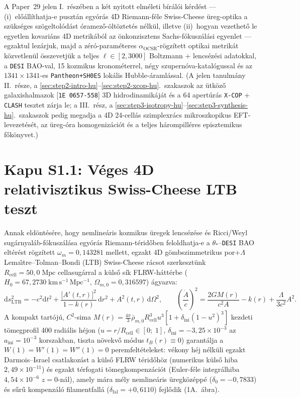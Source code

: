 \documentclass[11pt,a4paper]{article}
\begin{document}
A Paper~29 jelen I.~részében a két nyitott elméleti bírálói kérdést --- (i)~előállíthatja-e pusztán egyórás 4D Riemann-féle Swiss-Cheese üreg-optika a szükséges szögeltolódást óramező-öltöztetés nélkül, illetve (ii)~hogyan vezethető le egyetlen kovariáns 4D metrikából az önkonzisztens Sachs-fókuszálási egyenlet --- egzaktul lezárjuk, majd a zéró-paraméteres $\alpha_{\mathrm{OCSR}}$-rögzített optikai metrikát közvetlenül összevetjük a teljes $\ell \in [2, 3000]$ Boltzmann + lencsézési adatokkal, a \texttt{DESI} BAO-val, 15 kozmikus kronométerrel, négy szupernóva-katalógussal és az $1341\times 1341$-es \texttt{Pantheon+SH0ES} lokális Hubble-áramlással. (A jelen tanulmány II.~része, a \ref{sec:step2-intro-hu}--\ref{sec:step2-xcop-hu}.~szakaszok az ütköző galaxishalmazok [\texttt{1E~0657-558}] 3D hidrodinamikáját és a 64 apertúrás \texttt{X-COP} + \texttt{CLASH} tesztet zárja le; a III.~rész, a \ref{sec:step3-isotropy-hu}--\ref{sec:step3-synthesis-hu}.~szakaszok pedig megadja a 4D 24-cellás szimplexrács mikroszkopikus EFT-levezetését, az üreg-óra homogenizációt és a teljes hárompilléres episztemikus főkönyvet.)

\section{Kapu S1.1: Véges 4D relativisztikus Swiss-Cheese LTB teszt}
Annak eldöntésére, hogy nemlineáris kozmikus üregek lencsézése és Ricci/Weyl sugárnyaláb-fókuszálása egyórás Riemann-téridőben feloldhatja-e a $\theta_*$--\texttt{DESI} BAO eltérést rögzített $\omega_m = 0{,}143281$ mellett, egzakt 4D gömbszimmetrikus por+$\Lambda$ Lema\^{\i}tre--Tolman--Bondi (LTB) Swiss-Cheese rácsot szerkesztünk $R_{\mathrm{cell}} = 50{,}0\;\mathrm{Mpc}$ cellasugárral a külső sík FLRW-háttérbe ($H_0 = 67{,}2730\;\mathrm{km\,s^{-1}\,Mpc^{-1}}$, $\Omega_{m,0} = 0{,}316597$) ágyazva:
\begin{equation}
    \mathrm{d}s_{\mathrm{LTB}}^2 = -c^2\mathrm{d}t^2 + \frac{\bigl[A'(t,r)\bigr]^2}{1 - k(r)}\,\mathrm{d}r^2 + A^2(t,r)\,\mathrm{d}\Omega^2, \qquad \left(\frac{\dot{A}}{c}\right)^2 = \frac{2GM(r)}{c^2 A} - k(r) + \frac{\Lambda}{3c^2}A^2.
    \label{eq:ltb-metric-hu}
\end{equation}
A kompakt tartójú, $C^2$-sima $M(r) = \frac{4\pi}{3}\bar{\rho}_{m,0} R_{\mathrm{cell}}^3 u^3 [1 + \delta_{\mathrm{ini}}(1 - u^2)^3]$ kezdeti tömegprofil 400 radiális héjon ($u = r/R_{\mathrm{cell}} \in [0;\; 1]$, $\delta_{\mathrm{ini}} = -3{,}25\times 10^{-3}$ az $a_{\mathrm{ini}} = 10^{-3}$ korszakban, tiszta növekvő módus $t_B(r) \equiv 0$) garantálja a $W(1) = W'(1) = W''(1) = 0$ peremfeltételeket: vékony héj nélküli egzakt Darmois--Israel csatlakozást a külső FLRW téridőhöz (numerikus külső hiba $2{,}49\times 10^{-11}$) és egzakt térfogati tömegkompenzációt (Euler-féle integrálhiba $4{,}54\times 10^{-6}$ $z = 0$-nál), amely mára mély nemlineáris üregközéppé ($\delta_0 = -0{,}7833$) és sűrű kompenzáló filamentfallá ($\delta_{\mathrm{fal}} = +0{,}6110$) fejlődik (1A.~ábra).
\end{document}
